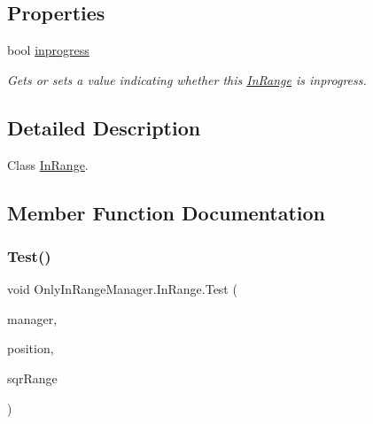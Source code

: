 \subsection*{Properties}
\begin{DoxyCompactItemize}
\item 
bool \hyperlink{class_only_in_range_manager_1_1_in_range_a4938a7b5f149e6ae13e1cd471341c57a}{inprogress}
\begin{DoxyCompactList}\small\item\em Gets or sets a value indicating whether this \hyperlink{class_only_in_range_manager_1_1_in_range}{In\+Range} is inprogress. \end{DoxyCompactList}\end{DoxyCompactItemize}


\subsection{Detailed Description}
Class \hyperlink{class_only_in_range_manager_1_1_in_range}{In\+Range}. 



\subsection{Member Function Documentation}
\mbox{\label{class_only_in_range_manager_1_1_in_range_a80c40fca70b79239c1a9b2b17a8c7d35}} 
\subsubsection{\texorpdfstring{Test()}{Test()}}
{\footnotesize\ttfamily void Only\+In\+Range\+Manager.\+In\+Range.\+Test (\begin{DoxyParamCaption}\item[{\hyperlink{class_only_in_range_manager}{Only\+In\+Range\+Manager}}]{manager,  }\item[{Vector3}]{position,  }\item[{float}]{sqr\+Range }\end{DoxyParamCaption})\hspace{0.3cm}{\ttfamily [inline]}}



